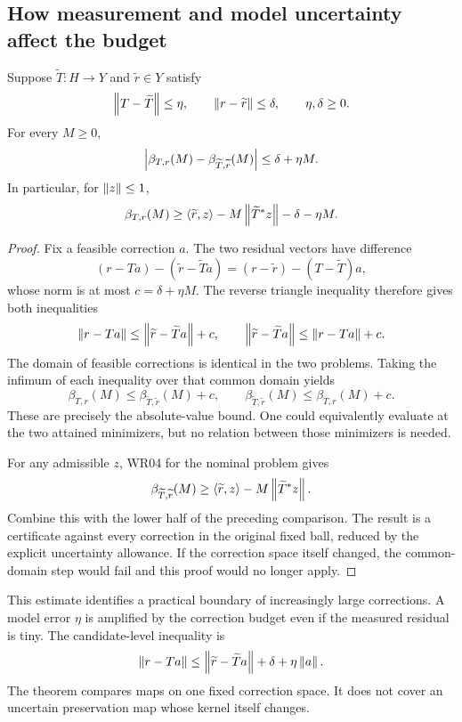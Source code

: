 \subsection{How measurement and model uncertainty affect the budget}
\begin{theorem}\label{WR05}
Suppose $\widetilde T:H\to Y$ and $\widetilde r\in Y$ satisfy
\[
 \left\lVert T-\widetilde T\right\rVert\le\eta,\qquad
 \left\lVert r-\widetilde r\right\rVert\le\delta,\qquad\eta,\delta\ge0.
\]
For every $M\ge0$,
\[
 \left\lvert\beta_{T,r}(M)-\beta_{\widetilde T,\widetilde r}(M)\right\rvert
 \le\delta+\eta M.
\]
In particular, for $\left\lVert z\right\rVert\le1$,
\[
 \beta_{T,r}(M)\ge
 \langle\widetilde r,z\rangle-M\left\lVert\widetilde T^*z\right\rVert
       -\delta-\eta M.
\]
\end{theorem}
\begin{proof}
Fix a feasible correction $a$. The two residual vectors have difference
\[
 (r-Ta)-(\widetilde r-\widetilde Ta)
 =(r-\widetilde r)-(T-\widetilde T)a,
\]
whose norm is at most $c=\delta+\eta M$. The reverse triangle inequality therefore gives both inequalities
\[
 \left\lVert r-Ta\right\rVert\le\left\lVert\widetilde r-\widetilde Ta\right\rVert+c,
 \qquad
 \left\lVert\widetilde r-\widetilde Ta\right\rVert\le\left\lVert r-Ta\right\rVert+c.
\]
The domain of feasible corrections is identical in the two problems. Taking the infimum of each inequality over that common domain yields
\[
 \beta_{T,r}(M)\le\beta_{\widetilde T,\widetilde r}(M)+c,
 \qquad
 \beta_{\widetilde T,\widetilde r}(M)\le\beta_{T,r}(M)+c.
\]
These are precisely the absolute-value bound. One could equivalently evaluate at the two attained minimizers, but no relation between those minimizers is needed.

For any admissible $z$, WR04 for the nominal problem gives
\[
 \beta_{\widetilde T,\widetilde r}(M)
 \ge\langle\widetilde r,z\rangle-M\left\lVert\widetilde T^*z\right\rVert.
\]
Combine this with the lower half of the preceding comparison. The result is a certificate against every correction in the original fixed ball, reduced by the explicit uncertainty allowance. If the correction space itself changed, the common-domain step would fail and this proof would no longer apply.
\end{proof}

This estimate identifies a practical boundary of increasingly large corrections. A model error $\eta$ is amplified by the correction budget even if the measured residual is tiny. The candidate-level inequality is
\[
 \left\lVert r-Ta\right\rVert\le\left\lVert\widetilde r-\widetilde Ta\right\rVert+\delta+\eta\left\lVert a\right\rVert.
\]
The theorem compares maps on one fixed correction space. It does not cover an uncertain preservation map whose kernel itself changes.

